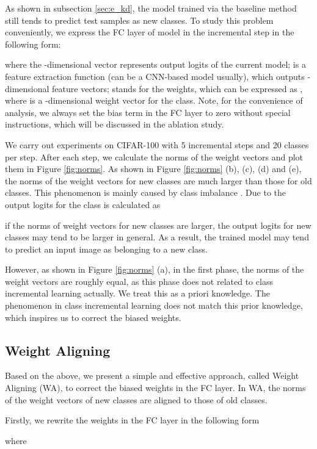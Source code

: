 \documentclass[10pt,twocolumn,letterpaper]{article}
\begin{document}
As shown in subsection \ref{sec:e_kd}, the model trained via the baseline method still tends to predict test samples as new classes. To study this problem conveniently, we express the FC layer of model in the  incremental step in the following form:

where the -dimensional vector  represents output logits of the current model;  is a feature extraction function (can be a CNN-based model usually), which outputs -dimensional feature vectors;  stands for the weights, which can be expressed as , where  is a -dimensional weight vector for the  class. Note, for the convenience of analysis, we always set the bias term in the FC layer to zero without special instructions, which will be discussed in the ablation study.

We carry out experiments on CIFAR-100 with 5 incremental steps and 20 classes per step. After each step, we calculate the norms of the weight vectors  and plot them in Figure \ref{fig:norms}. As shown in Figure \ref{fig:norms} (b), (c), (d) and (e), the norms of the weight vectors for new classes are much larger than those for old classes. This phenomenon is mainly caused by class imbalance \cite{Guo2017OneshotFR,Liu2017SphereFaceDH}. Due to the output logits for the  class is calculated as 

if the norms of weight vectors for new classes are larger, the output logits for new classes may tend to be larger in general. As a result, the trained model may tend to predict an input image as belonging to a new class. 

However, as shown in Figure \ref{fig:norms} (a), in the first phase, the norms of the weight vectors are roughly equal, as this phase does not related to class incremental learning actually. We treat this as a priori knowledge. The phenomenon in class incremental learning does not match this prior knowledge, which inspires us to correct the biased weights.


\subsection{Weight Aligning}\label{sec:WA}
Based on the above, we present a simple and effective approach, called Weight Aligning (WA), to correct the biased weights in the FC layer. In WA, the norms of the weight vectors of new classes are aligned to those of old classes.

Firstly, we rewrite the weights in the FC layer in the following form

where 
\end{document}
